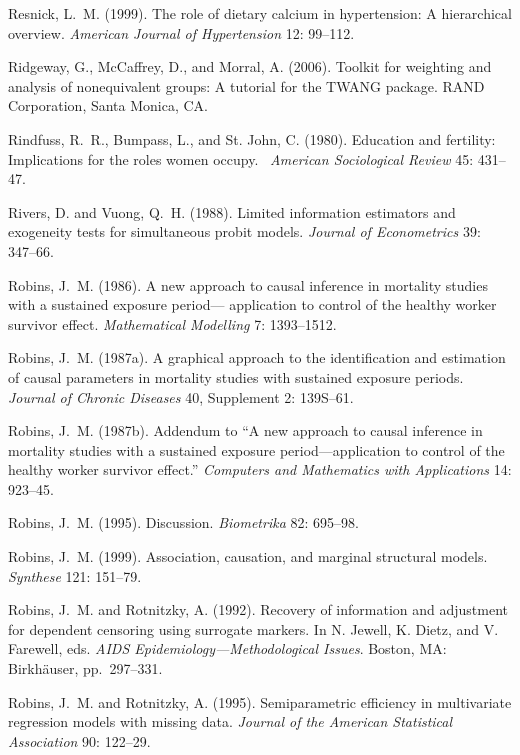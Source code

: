 \smallskip\noindent
Resnick, L.~M. (1999).
The role of dietary calcium in hypertension: A hierarchical overview.
{\it American Journal of Hypertension\/} 12: 99--112.

\smallskip\noindent
Ridgeway, G., McCaffrey, D., and Morral, A. (2006).
Toolkit for weighting and analysis of nonequivalent groups: A tutorial for the TWANG package.
RAND Corporation, Santa Monica, CA.

\smallskip\noindent
Rindfuss, R.~R., Bumpass, L., and St. John, C. (1980).
Education and fertility: Implications for the roles women occupy.
{\it \ American Sociological Review\/} 45: 431--47.

\smallskip\noindent
Rivers, D. and Vuong, Q.~H. (1988).
Limited information estimators and exogeneity tests for simultaneous probit models.
{\it Journal of Econometrics\/} 39: 347--66.

\smallskip\noindent
Robins, J.~M. (1986).
A new approach to causal inference in mortality studies with a sustained exposure period---
application to control of the healthy worker survivor effect.
{\it Mathematical Modelling\/} 7: 1393--1512.

\smallskip\noindent
Robins, J.~M. (1987a).
A graphical approach to the identification and estimation of causal parameters
in mortality studies with sustained exposure periods.
{\it Journal of Chronic Diseases\/} 40, Supplement 2: 139S--61.

\smallskip\noindent
Robins, J.~M. (1987b).
Addendum to  ``A new approach to causal inference in mortality studies with a sustained
exposure period---application to control of the healthy worker survivor effect.''
{\it Computers and Mathematics with Applications\/} 14: 923--45.

\smallskip\noindent
Robins, J.~M. (1995).
Discussion.
{\it Biometrika\/} 82: 695--98.

\smallskip\noindent
Robins, J.~M. (1999).
Association, causation, and marginal structural models.
{\it Synthese\/} 121: 151--79.

\smallskip\noindent
Robins, J.~M. and Rotnitzky, A. (1992).
Recovery of information and adjustment for dependent censoring using surrogate markers.
In N. Jewell, K. Dietz, and V. Farewell, eds.
{\it AIDS Epidemiology---Methodological Issues\/}.
Boston, MA: Birkh\"auser, pp.~297--331.

\smallskip\noindent
Robins, J.~M. and Rotnitzky, A. (1995).
Semiparametric efficiency in multivariate regression models with missing data.
{\it Journal of the American Statistical Association\/} 90: 122--29.

